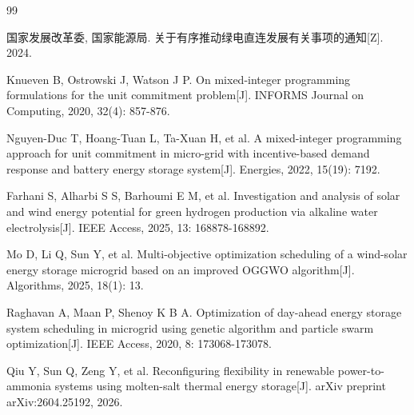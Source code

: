 \documentclass[a4paper]{neepumcm}
\begin{document}
\maketitle
\newpage












\begin{thebibliography}{99}

 国家发展改革委, 国家能源局. 关于有序推动绿电直连发展有关事项的通知[Z]. 2024.

 Knueven B, Ostrowski J, Watson J P. On mixed-integer programming formulations for the unit commitment problem[J]. INFORMS Journal on Computing, 2020, 32(4): 857-876.

 Nguyen-Duc T, Hoang-Tuan L, Ta-Xuan H, et al. A mixed-integer programming approach for unit commitment in micro-grid with incentive-based demand response and battery energy storage system[J]. Energies, 2022, 15(19): 7192.

 Farhani S, Alharbi S S, Barhoumi E M, et al. Investigation and analysis of solar and wind energy potential for green hydrogen production via alkaline water electrolysis[J]. IEEE Access, 2025, 13: 168878-168892.

 Mo D, Li Q, Sun Y, et al. Multi-objective optimization scheduling of a wind-solar energy storage microgrid based on an improved OGGWO algorithm[J]. Algorithms, 2025, 18(1): 13.

 Raghavan A, Maan P, Shenoy K B A. Optimization of day-ahead energy storage system scheduling in microgrid using genetic algorithm and particle swarm optimization[J]. IEEE Access, 2020, 8: 173068-173078.

 Qiu Y, Sun Q, Zeng Y, et al. Reconfiguring flexibility in renewable power-to-ammonia systems using molten-salt thermal energy storage[J]. arXiv preprint arXiv:2604.25192, 2026.
\end{thebibliography}

\newpage
\begin{appendices}


\end{appendices}
\end{document}
